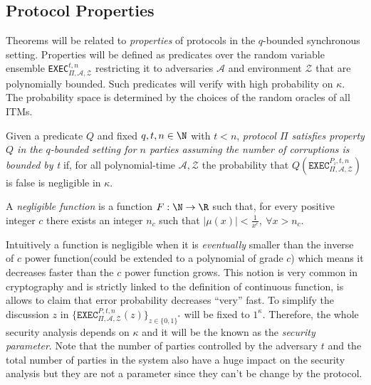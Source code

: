 \documentclass[..]{subfiles}
\begin{document}
\subsection{Protocol Properties}

Theorems will be related to \textit{properties} of protocols in the $q$-bounded synchronous setting. Properties will be defined as predicates over the random variable ensemble \texttt{EXEC$_{\Pi, \mathcal{A}, \mathcal{Z}}^{t, n}$} restricting it to adversaries $\mathcal{A}$ and environment $\mathcal{Z}$ that are polynomially bounded. Such predicates will verify with high probability on $\kappa$. The probability space is determined by the choices of the random oracles of all ITMs.

\begin{definition}
	\normalfont
	Given a predicate $Q$ and fixed $q, t, n \in \N$ with $t < n$, \textit{protocol $\Pi$ satisfies property $Q$ in the $q$-bounded setting for $n$ parties assuming the number of corruptions is bounded by t} if, for all polynomial-time $\mathcal{A,Z}$ the probability that $Q(\texttt{EXEC}_{\Pi, \mathcal{A}, \mathcal{Z}}^{P_i, t, n})$ is false is negligible in $\kappa$.
\end{definition}

\begin{definition}
	\normalfont
	A \textit{negligible function} is a function $F:\N \rightarrow \R$ such that, for every positive integer $c$ there exists an integer $n_c$ such that $|\mu(x)| < \frac{1}{x^c}, \ \forall x > n_c$.
\end{definition}

Intuitively a function is negligible when it is \textit{eventually} smaller than the inverse of $c$ power function(could be extended to a polynomial of grade $c$) which means it decreases faster than the $c$ power function grows. This notion is very common in cryptography and is strictly linked to the definition of continuous function, is allows to claim that error probability decreases ``very'' fast. To simplify the discussion $z$ in $\{\texttt{EXEC}_{\Pi, \mathcal{A}, \mathcal{Z}}^{P, t, n}(z)\}_{z \in \{0, 1\}^*}$ will be fixed to $1^\kappa$. Therefore, the whole security analysis depends on $\kappa$ and it will be the known as the \textit{security parameter}. Note that the number of parties controlled by the adversary $t$ and the total number of parties in the system also have a huge impact on the security analysis but they are not a parameter since they can't be change by the protocol. 
\end{document}
